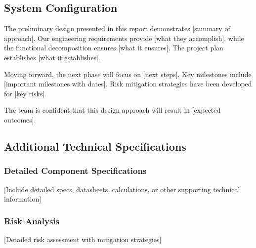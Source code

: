 \documentclass[final]{../designreport}
\begin{document}
\subsection{System Configuration}



The preliminary design presented in this report demonstrates [summary of approach]. Our engineering requirements provide [what they accomplish], while the functional decomposition ensures [what it ensures]. The project plan establishes [what it establishes].

Moving forward, the next phase will focus on [next steps]. Key milestones include [important milestones with dates]. Risk mitigation strategies have been developed for [key risks].

The team is confident that this design approach will result in [expected outcomes].

\printbibliography

\makeappendix

\subsection{Additional Technical Specifications}

\subsubsection{Detailed Component Specifications}
[Include detailed specs, datasheets, calculations, or other supporting technical information]

\subsubsection{Risk Analysis}
[Detailed risk assessment with mitigation strategies]
\end{document}
